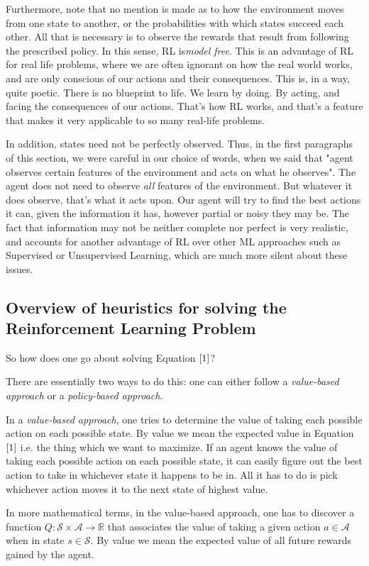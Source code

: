 \documentclass{article}
\begin{document}
Furthermore, note that no mention is made as to how the environment moves from one state to another, or the probabilities with which states succeed each other. All that is necessary is to observe the rewards that result from following the prescribed policy. In this sense, RL is\emph{model free}. This is an advantage of RL for real life problems, where we are often ignorant on how the real world works, and are only conscious of our actions and their consequences. This is, in a way, quite poetic. There is no blueprint to life. We learn by doing. By acting, and facing the consequences of our actions. That's how RL works, and that's a feature that makes it very applicable to so many real-life problems.

In addition, states need not be perfectly observed. Thus, in the first paragraphs of this section, we were careful in our choice of words, when we said  that "agent observes certain features of the environment and acts on what he observes". The agent does not need to observe \emph{all} features of the environment. But whatever it does observe, that's what it acts upon. Our agent will try to find the best actions it can, given the information it has, however partial or noisy they may be. The fact that information may not be neither complete nor perfect is very realistic, and accounts for another advantage of RL over other ML approaches such as Supervised or Unsupervised Learning, which are much more silent about these issues.

\subsection{Overview of heuristics for solving the Reinforcement Learning Problem}

So how does one go about solving Equation $\ref{1}$?

There are essentially two ways to do this: one can either follow a \emph{value-based approach} or a \emph{policy-based approach}.

In a \emph{value-based approach}, one tries to determine the value of taking each possible action on each possible state. By value we mean the expected value in Equation $\ref{1}$ i.e. the thing which we want to maximize. If an agent knows the value of taking each possible action on each possible state, it can easily figure out the best action to take in whichever state it happens to be in. All it has to do is pick whichever action moves it to the next state of highest value.

In more mathematical terms, in the value-based approach, one has to discover a function $Q: \mathcal{S} \times \mathcal{A} \to \mathbb{R}$ that associates the value of taking a given action $a \in \mathcal{A}$ when in state $s \in \mathcal{S}$. By value we mean the expected value of all future rewards gained by the agent.
\end{document}
